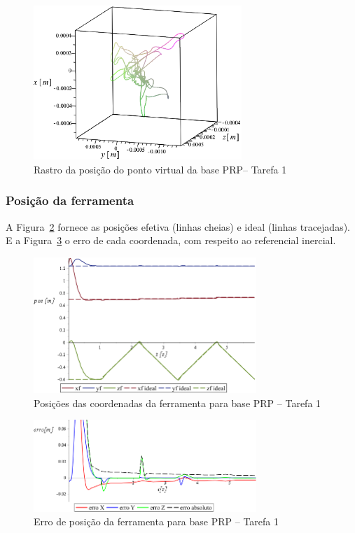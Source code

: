 \begin{figure}[h!]
	\centering 
 	\includegraphics[width=0.70\textwidth]{figs/t1_pvirtural_base_prp}
 	\caption{Rastro da posição do ponto virtual da base PRP-- Tarefa 1}
 	\label{fig::t1_pvirtural_base_prp}
\end{figure}


\subsubsection{Posição da ferramenta}

A Figura~\ref{fig::t1_posf_base_prp} fornece as posições efetiva (linhas cheias)
e ideal (linhas tracejadas). E a Figura~\ref{fig::t1_erroposf_base_prp} o erro
de cada coordenada, com respeito ao referencial inercial.

\begin{figure}[h!]
	\centering 
 	\includegraphics[width=0.75\textwidth]{figs/t1_posf_base_prp}
 	\caption{Posições das coordenadas da ferramenta para base PRP -- Tarefa
 	1}
 	\label{fig::t1_posf_base_prp}
\end{figure}

\begin{figure}[h!]
	\centering 
 	\includegraphics[width=0.75\textwidth]{figs/t1_erroposf_base_prp}
 	\caption{Erro de posição da ferramenta para base PRP -- Tarefa 1}
 	\label{fig::t1_erroposf_base_prp}
\end{figure}



